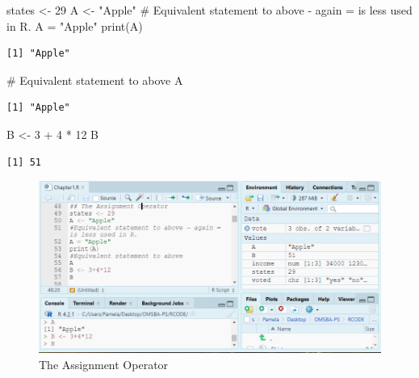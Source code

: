 \documentclass[
  letterpaper,
  DIV=11,
  numbers=noendperiod]{scrreprt}
\newenvironment{Shaded}{\begin{snugshade}}{\end{snugshade}}
\newcommand{\CommentTok}[1]{\textcolor[rgb]{0.37,0.37,0.37}{#1}}
\newcommand{\DecValTok}[1]{\textcolor[rgb]{0.68,0.00,0.00}{#1}}
\newcommand{\FunctionTok}[1]{\textcolor[rgb]{0.28,0.35,0.67}{#1}}
\newcommand{\NormalTok}[1]{\textcolor[rgb]{0.00,0.23,0.31}{#1}}
\newcommand{\OtherTok}[1]{\textcolor[rgb]{0.00,0.23,0.31}{#1}}
\newcommand{\SpecialCharTok}[1]{\textcolor[rgb]{0.37,0.37,0.37}{#1}}
\newcommand{\StringTok}[1]{\textcolor[rgb]{0.13,0.47,0.30}{#1}}
\begin{document}
\begin{Shaded}
\begin{Highlighting}[]
\NormalTok{states }\OtherTok{\textless{}{-}} \DecValTok{29}
\NormalTok{A }\OtherTok{\textless{}{-}} \StringTok{"Apple"}
\CommentTok{\# Equivalent statement to above {-} again = is less used in R.}
\NormalTok{A }\OtherTok{=} \StringTok{"Apple"}
\FunctionTok{print}\NormalTok{(A)}
\end{Highlighting}
\end{Shaded}

\begin{verbatim}
[1] "Apple"
\end{verbatim}

\begin{Shaded}
\begin{Highlighting}[]
\CommentTok{\# Equivalent statement to above}
\NormalTok{A}
\end{Highlighting}
\end{Shaded}

\begin{verbatim}
[1] "Apple"
\end{verbatim}

\begin{Shaded}
\begin{Highlighting}[]
\NormalTok{B }\OtherTok{\textless{}{-}} \DecValTok{3} \SpecialCharTok{+} \DecValTok{4} \SpecialCharTok{*} \DecValTok{12}
\NormalTok{B}
\end{Highlighting}
\end{Shaded}

\begin{verbatim}
[1] 51
\end{verbatim}

\begin{figure}[H]

{\centering \includegraphics{Pictures/Ch1/Assignment.png}

}

\caption{The Assignment Operator}

\end{figure}%
\end{document}
